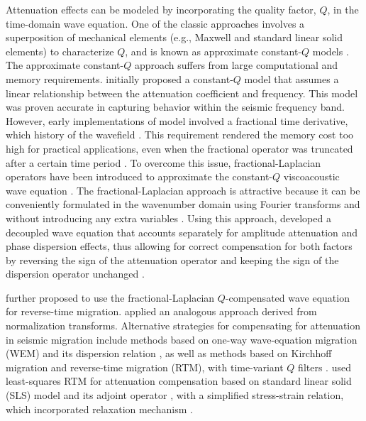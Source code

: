 Attenuation effects can be modeled by incorporating the quality factor, $Q$, in the time-domain wave equation. One of the classic approaches involves a superposition of mechanical elements (e.g., Maxwell and standard linear solid elements) to characterize $Q$, and is known as approximate constant-$Q$ models \cite[]{liu76,blanch95,carc07,zhu13a}. The approximate constant-$Q$ approach suffers from large computational and memory requirements. \cite{kja79} initially proposed a constant-$Q$ model that assumes a linear relationship between the attenuation coefficient and frequency. This model was proven accurate in capturing  behavior within the seismic frequency band. However, early implementations of  model involved a fractional time derivative, which  history of the wavefield \cite[]{caputo71}. This requirement rendered the memory cost too high for practical applications, even when the fractional operator was truncated after a certain time period \cite[]{pod99,carc02,carc09}. To overcome this issue, fractional-Laplacian operators \cite[]{chenholm04} have been introduced to approximate the constant-$Q$ viscoacoustic wave equation \cite[]{carc10,zhu14a}. The fractional-Laplacian approach is attractive because it can be conveniently formulated in the wavenumber domain using Fourier transforms and without introducing any extra variables \cite[]{carc10}. Using this approach, \cite{zhu14a} developed a decoupled wave equation that accounts separately for amplitude attenuation and phase dispersion effects, thus allowing for correct compensation for both factors by reversing the sign of the attenuation operator and keeping the sign of the dispersion operator unchanged \cite[]{zhu14c}.

\cite{zhu14b} further proposed to use the fractional-Laplacian $Q$-compensated wave equation for reverse-time migration. \cite{zhang10} applied an analogous approach derived from normalization transforms. Alternative strategies for compensating for attenuation in seismic migration include methods based on one-way wave-equation migration (WEM) and its dispersion relation \cite[]{valenciano12}, as well as methods based on Kirchhoff migration and reverse-time migration (RTM), with time-variant $Q$ filters \cite[]{cavalca13}. \cite{dutta14} used least-squares RTM for attenuation compensation based on standard linear solid (SLS) model and its adjoint operator \cite[]{blanchsymes}, with a simplified stress-strain relation, which incorporated  relaxation mechanism \cite[]{rob94,blanch95}.

